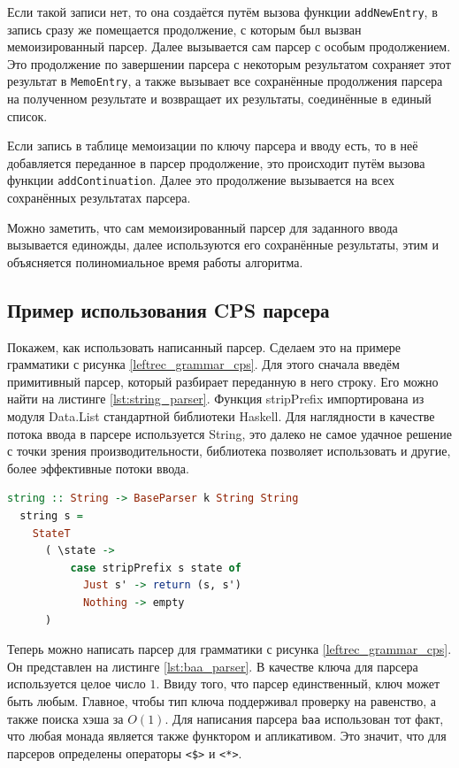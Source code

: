 \documentclass[times]{itmo-student-thesis}
\begin{document}
Если такой записи нет, то она создаётся путём вызова функции \lstinline{addNewEntry}, в запись сразу же помещается продолжение, с
которым был вызван мемоизированный парсер. Далее вызывается сам парсер с особым продолжением. Это продолжение
по завершении парсера с некоторым результатом сохраняет этот результат в \lstinline{MemoEntry}, а также вызывает все
сохранённые продолжения парсера на полученном результате и возвращает их результаты, соединённые в единый список.

Если запись в таблице мемоизации по ключу парсера и вводу есть, то в неё добавляется переданное в парсер продолжение, это происходит
путём вызова функции \lstinline{addContinuation}. Далее это продолжение вызывается на всех сохранённых результатах парсера.

Можно заметить, что сам мемоизированный парсер для заданного ввода вызывается единожды, далее используются его
сохранённые результаты, этим и объясняется полиномиальное время работы алгоритма.

\subsection{Пример использования CPS парсера}\label{sec:cps_parser_example}

Покажем, как использовать написанный парсер. Сделаем это на примере грамматики с рисунка \ref{leftrec_grammar_cps}.
Для этого сначала введём примитивный парсер, который разбирает переданную в него строку. Его можно найти на листинге
\ref{lst:string_parser}. Функция stripPrefix импортирована из модуля Data.List стандартной библиотеки Haskell. Для
наглядности в качестве потока ввода в парсере используется String,  это далеко не самое удачное решение с точки зрения
производительности, библиотека позволяет использовать и другие, более эффективные потоки ввода.

\begin{lstlisting}[language=Haskell,float=!h,caption={Парсер для строки},label={lst:string_parser}]
  string :: String -> BaseParser k String String
  string s =
    StateT
      ( \state ->
          case stripPrefix s state of
            Just s' -> return (s, s')
            Nothing -> empty
      )
\end{lstlisting}

Теперь можно написать парсер для грамматики с рисунка \ref{leftrec_grammar_cps}. Он представлен на листинге
\ref{lst:baa_parser}.	В качестве ключа для парсера используется целое число $1$. Ввиду того, что
парсер единственный, ключ может быть любым. Главное, чтобы тип ключа поддерживал проверку на равенство, а также поиска
хэша за $O(1)$. Для написания парсера \lstinline{baa} использован тот факт, что любая монада
является также функтором и апликативом. Это значит, что для парсеров определены операторы
\lstinline{<$>} и \lstinline{<*>}.
\end{document}
